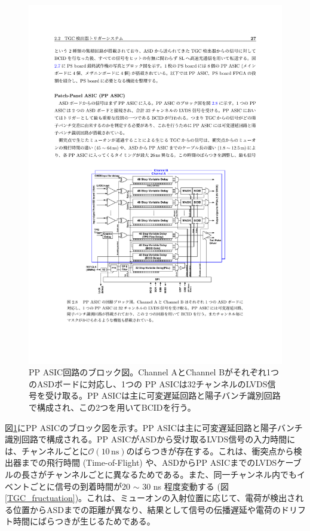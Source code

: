     \begin{figure} 
    \centering
    \includegraphics[width=16cm]{fig/Intro/TGC_PPASIC.pdf}
    \caption[PP ASIC回路のブロック図]{PP ASIC回路のブロック図\cite{PPASIC}。Channel AとChannel Bがそれぞれ1つのASDボードに対応し、1つの PP ASICは32チャンネルのLVDS信号を受け取る。PP ASICは主に可変遅延回路と陽子バンチ識別回路で構成され、この2つを用いてBCIDを行う。}
    \label{TGC_PPASIC}
    \end{figure}

    図\ref{TGC_PPASIC}にPP ASICのブロック図を示す。PP ASICは主に可変遅延回路と陽子バンチ識別回路で構成される。PP ASICがASDから受け取るLVDS信号の入力時間には、チャンネルごとに$\mathcal{O}(10\,\mathrm{ns})$のばらつきが存在する。これは、衝突点から検出器までの飛行時間 (Time-of-Flight) や、ASDからPP ASICまでのLVDSケーブルの長さがチャンネルごとに異なるためである。また、同一チャンネル内でもイベントごとに信号の到着時間が20 $\sim$ 30 ns 程度変動する (図\ref{TGC_fructuation})。これは、ミューオンの入射位置に応じて、電荷が検出される位置からASDまでの距離が異なり、結果として信号の伝播遅延や電荷のドリフト時間にばらつきが生じるためである。

